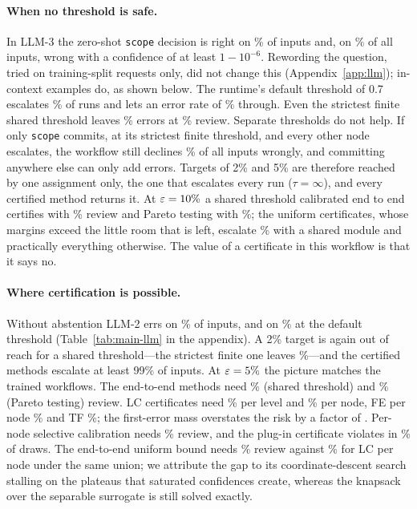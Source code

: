 \paragraph{When no threshold is safe.} In LLM-3 the zero-shot \texttt{scope} decision is
right on \LlmRootAccT\% of inputs and, on \LlmRootWrongSatT\% of all inputs, wrong with a
confidence of at least $1-10^{-6}$. Rewording the question, tried on training-split requests
only, did not change this (Appendix~\ref{app:llm}); in-context examples do, as shown below. The
runtime's default threshold of 0.7 escalates \LlmDefaultReviewT\% of runs and lets an error
rate of \LlmDefaultRiskT\% through. Even the strictest finite shared threshold leaves
\LlmTopRiskT\% errors at \LlmTopReviewT\% review. Separate thresholds do not help. If only
\texttt{scope} commits, at its strictest finite threshold, and every other node escalates,
the workflow still declines \LlmRootOnlyRiskT\% of all inputs wrongly, and committing anywhere
else can only add errors. Targets of 2\% and 5\% are therefore reached by one assignment
only, the one that escalates every run ($\tau=\infty$), and every certified method returns
it. At $\varepsilon=10\%$ a
shared threshold calibrated end to end certifies with \RevTSharedTen\% review and Pareto
testing with \RevTParetoTen\%; the uniform certificates, whose margins exceed the little
room that is left, escalate \RevTLCsharedTen\% with a shared module and practically
everything otherwise. The value of a certificate in this workflow is that it says no.

\paragraph{Where certification is possible.} Without abstention LLM-2 errs on
\FreeErrLlm\% of inputs, and on \LlmDefaultRiskL\% at the default threshold
(Table~\ref{tab:main-llm} in the appendix). A 2\% target is again out of reach for a shared threshold---the
strictest finite one leaves \LlmTopRiskL\%---and the certified methods escalate at least
99\% of inputs. At
$\varepsilon=5\%$ the picture matches the trained workflows. The end-to-end methods need
\RevLSharedFive\% (shared threshold) and \RevLParetoFive\% (Pareto testing) review. LC
certificates need \RevLLClevelFive\% per level and \RevLLCnodeFive\% per node, FE per node
\RevLFEnodeFive\% and TF \RevLTFnodeFive\%; the first-error mass overstates the risk by a
factor of \FdRatioL. Per-node selective calibration needs \RevLPerNodeFive\% review, and the
plug-in certificate violates in \ViolLPlugFive\% of draws. The end-to-end uniform bound
needs \RevLUnifFive\% review against \RevLLCnodeFive\% for LC per node under the same
union; we attribute the gap to its coordinate-descent search stalling on the plateaus that
saturated confidences create, whereas the knapsack over the separable surrogate is still
solved exactly.

